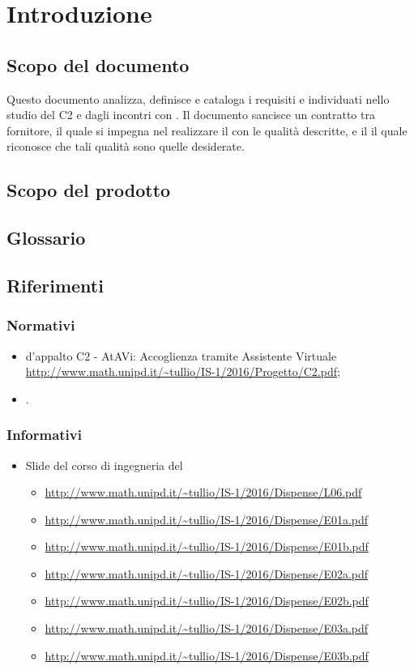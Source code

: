 \section{Introduzione}
 \subsection{Scopo del documento}
 Questo documento analizza, definisce e cataloga i requisiti e  individuati nello studio del  C2 e dagli incontri con \PROPONENTE. 
 Il documento sancisce un contratto tra fornitore, il quale si impegna nel realizzare il  con le qualità descritte,  e il  il quale riconosce che tali qualità sono quelle desiderate. 
 \subsection{Scopo del prodotto}
 \SCOPO
 \subsection{Glossario}
 \GLOSSARIO
 \subsection{Riferimenti}
  \subsubsection{Normativi}
  \begin{itemize}
  	\item {} d'appalto C2 - AtAVi: Accoglienza tramite Assistente Virtuale \\
  	\url{http://www.math.unipd.it/~tullio/IS-1/2016/Progetto/C2.pdf};
    \item \NPdoc.
  \end{itemize}
  \subsubsection{Informativi}
    \begin{itemize}
    	\item Slide del corso di ingegneria del 
    	\begin{itemize}
    		\item \url{http://www.math.unipd.it/~tullio/IS-1/2016/Dispense/L06.pdf}
    		\item \url{http://www.math.unipd.it/~tullio/IS-1/2016/Dispense/E01a.pdf}
    		\item \url{http://www.math.unipd.it/~tullio/IS-1/2016/Dispense/E01b.pdf}
    		\item \url{http://www.math.unipd.it/~tullio/IS-1/2016/Dispense/E02a.pdf}
    		\item \url{http://www.math.unipd.it/~tullio/IS-1/2016/Dispense/E02b.pdf}
    		\item \url{http://www.math.unipd.it/~tullio/IS-1/2016/Dispense/E03a.pdf}
    		\item \url{http://www.math.unipd.it/~tullio/IS-1/2016/Dispense/E03b.pdf}
    	\end{itemize}
    \end{itemize}